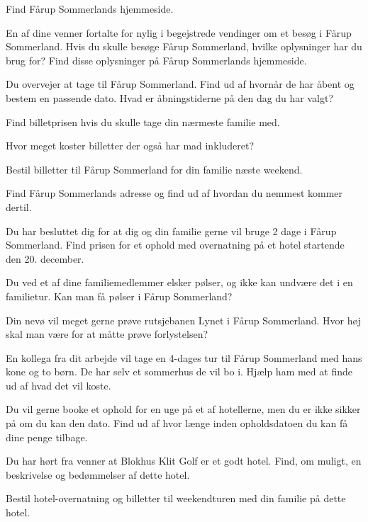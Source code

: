 \documentclass[10pt,a5paper,landscape]{article}
\newcommand{\spoergsmaal}[2]{%
    \clearpage
    \mbox{}
    \vfill
    \begin{center}\huge #1\end{center}
    \vfill
    \mbox{}
}
\begin{document}
\spoergsmaal{Find Fårup Sommerlands hjemmeside.}

\spoergsmaal{%
    En af dine venner fortalte for nylig i begejstrede vendinger om et
    besøg i Fårup Sommerland. Hvis du skulle besøge Fårup Sommerland, hvilke
    oplysninger har du brug for? Find disse oplysninger på Fårup Sommerlands
    hjemmeside.
}

\spoergsmaal{%
    Du overvejer at tage til Fårup Sommerland. Find ud af hvornår de har
    åbent og bestem en passende dato. Hvad er åbningstiderne på den dag du har
    valgt?
}


\spoergsmaal{%
    Find billetprisen hvis du skulle tage din nærmeste familie med.
}

\spoergsmaal{%
    Hvor meget koster billetter der også har mad inkluderet?
}

\spoergsmaal{%
    Bestil billetter til Fårup Sommerland for din familie næste weekend.
}

\spoergsmaal{%
    Find Fårup Sommerlands adresse og find ud af hvordan du nemmest
    kommer dertil.
}

\spoergsmaal{%
    Du har besluttet dig for at dig og din familie gerne vil bruge 2 dage
    i Fårup Sommerland. Find prisen for et ophold med overnatning på et hotel
    startende den 20. december.
}

\spoergsmaal{%
    Du ved et af dine familiemedlemmer elsker pølser, og ikke kan undvære det i en familietur. Kan man få pølser i Fårup Sommerland?
}

\spoergsmaal{%
    Din nevø vil meget gerne prøve rutsjebanen Lynet i Fårup Sommerland.
    Hvor høj skal man være for at måtte prøve forlystelsen?
}

\spoergsmaal{%
    En kollega fra dit arbejde vil tage en
    4-dages tur til Fårup Sommerland med hans kone og to børn. De har selv et
    sommerhus de vil bo i. Hjælp ham med at finde ud af hvad det vil koste.
}

\spoergsmaal{%
    Du vil gerne booke et ophold for en uge på et af hotellerne, men du
    er ikke sikker på om du kan den dato. Find ud af hvor længe inden opholdsdatoen
    du kan få dine penge tilbage.
}

\spoergsmaal{%
    Du har hørt fra venner at Blokhus Klit Golf er et godt hotel. Find,
    om muligt, en beskrivelse og bedømmelser af dette hotel.
}

\spoergsmaal{%
    Bestil hotel-overnatning og billetter til weekendturen med din
    familie på dette hotel.
}
\end{document}
